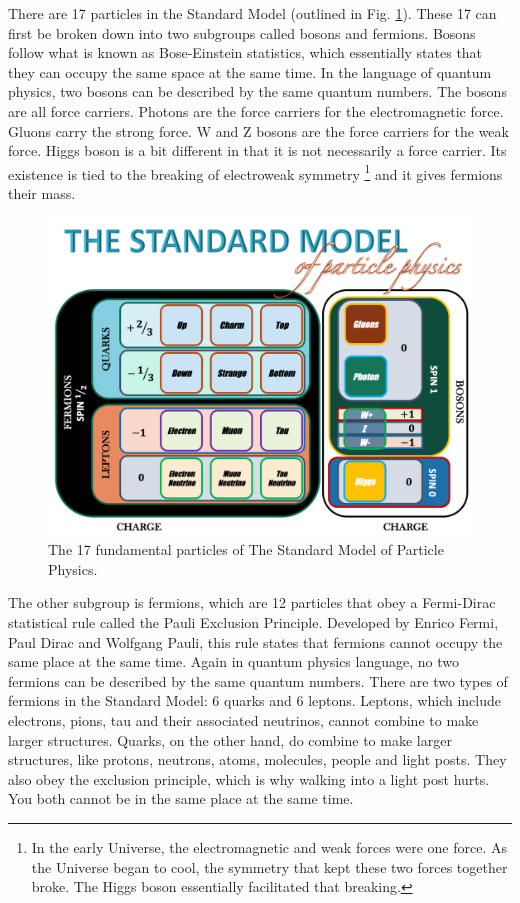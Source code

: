 There are 17 particles in the Standard Model (outlined in Fig. \ref{fig:standard_model}). These 17 can first be broken down into two subgroups called bosons and fermions. Bosons follow what is known as Bose-Einstein statistics, which essentially states that they can occupy the same space at the same time. In the language of quantum physics, two bosons can be described by the same quantum numbers. The bosons are all force carriers. Photons are the force carriers for the electromagnetic force. Gluons carry the strong force. W and Z bosons are the force carriers for the weak force. Higgs boson is a bit different in that it is not necessarily a force carrier. Its existence is tied to the breaking of electroweak symmetry \footnote{In the early Universe, the electromagnetic and weak forces were one force. As the Universe began to cool, the symmetry that kept these two forces together broke. The Higgs boson essentially facilitated that breaking.} and it gives fermions their mass.

\begin{figure}[h!]
	\centering
	\includegraphics[width=0.8\linewidth]{figures/standard_model.png}
	\caption{The 17 fundamental particles of The Standard Model of Particle Physics.}
	\label{fig:standard_model}
\end{figure}

The other subgroup is fermions, which are 12 particles that obey a Fermi-Dirac statistical rule called the Pauli Exclusion Principle. Developed by Enrico Fermi, Paul Dirac and Wolfgang Pauli, this rule states that fermions cannot occupy the same place at the same time. Again in quantum physics language, no two fermions can be described by the same quantum numbers. There are two types of fermions in the Standard Model: 6 quarks and 6 leptons. Leptons, which include electrons, pions, tau and their associated neutrinos, cannot combine to make larger structures. Quarks, on the other hand, do combine to make larger structures, like protons, neutrons, atoms, molecules, people and light posts. They also obey the exclusion principle, which is why walking into a light post hurts. You both cannot be in the same place at the same time.

